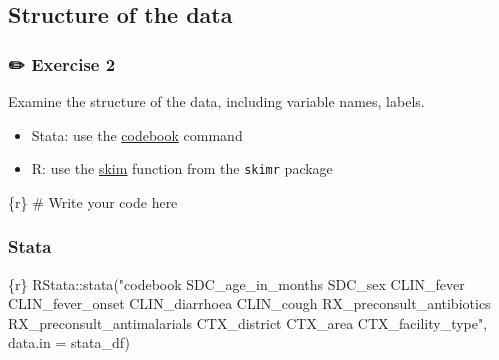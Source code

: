 \documentclass[
  letterpaper,
  DIV=11,
  numbers=noendperiod,
  oneside]{scrreprt}
\newenvironment{Shaded}{\begin{snugshade}}{\end{snugshade}}
\newcommand{\AttributeTok}[1]{\textcolor[rgb]{0.40,0.45,0.13}{#1}}
\newcommand{\CommentTok}[1]{\textcolor[rgb]{0.37,0.37,0.37}{#1}}
\newcommand{\FunctionTok}[1]{\textcolor[rgb]{0.28,0.35,0.67}{#1}}
\newcommand{\InformationTok}[1]{\textcolor[rgb]{0.37,0.37,0.37}{#1}}
\newcommand{\NormalTok}[1]{\textcolor[rgb]{0.00,0.23,0.31}{#1}}
\newcommand{\SpecialCharTok}[1]{\textcolor[rgb]{0.37,0.37,0.37}{#1}}
\newcommand{\StringTok}[1]{\textcolor[rgb]{0.13,0.47,0.30}{#1}}
\providecommand{\tightlist}{%
  \setlength{\itemsep}{0pt}\setlength{\parskip}{0pt}}\usepackage{longtable,booktabs,array}
\begin{document}
\hypertarget{structure-of-the-data-1}{%
\subsection{Structure of the data}\label{structure-of-the-data-1}}

\hypertarget{exercise-2-1}{%
\subsubsection{\texorpdfstring{{✏️} Exercise
2}{✏️ Exercise 2}}\label{exercise-2-1}}

Examine the structure of the data, including variable names, labels.

\begin{tcolorbox}[enhanced jigsaw, colbacktitle=quarto-callout-tip-color!10!white, titlerule=0mm, breakable, opacityback=0, opacitybacktitle=0.6, left=2mm, coltitle=black, colback=white, title=\textcolor{quarto-callout-tip-color}{\faLightbulb}\hspace{0.5em}{Tip}, rightrule=.15mm, colframe=quarto-callout-tip-color-frame, toprule=.15mm, bottomtitle=1mm, toptitle=1mm, arc=.35mm, bottomrule=.15mm, leftrule=.75mm]

\begin{itemize}
\tightlist
\item
  Stata: use the
  \href{https://www.stata.com/manuals/dcodebook.pdf}{codebook} command
\item
  R: use the
  \href{https://docs.ropensci.org/skimr/reference/skim.html}{skim}
  function from the \texttt{skimr} package
\end{itemize}

\end{tcolorbox}

\begin{Shaded}
\begin{Highlighting}[]
\InformationTok{\textasciigrave{}\textasciigrave{}\textasciigrave{}\{r\}}
\CommentTok{\# Write your code here}
\InformationTok{\textasciigrave{}\textasciigrave{}\textasciigrave{}}
\end{Highlighting}
\end{Shaded}

\hypertarget{stata-5}{%
\subsubsection{Stata}\label{stata-5}}

\begin{Shaded}
\begin{Highlighting}[]
\InformationTok{\textasciigrave{}\textasciigrave{}\textasciigrave{}\{r\}}
\NormalTok{RStata}\SpecialCharTok{::}\FunctionTok{stata}\NormalTok{(}\StringTok{"codebook SDC\_age\_in\_months SDC\_sex CLIN\_fever CLIN\_fever\_onset CLIN\_diarrhoea CLIN\_cough RX\_preconsult\_antibiotics RX\_preconsult\_antimalarials CTX\_district CTX\_area CTX\_facility\_type"}\NormalTok{,}
              \AttributeTok{data.in =}\NormalTok{ stata\_df)}
\InformationTok{\textasciigrave{}\textasciigrave{}\textasciigrave{}}
\end{Highlighting}
\end{Shaded}
\end{document}
